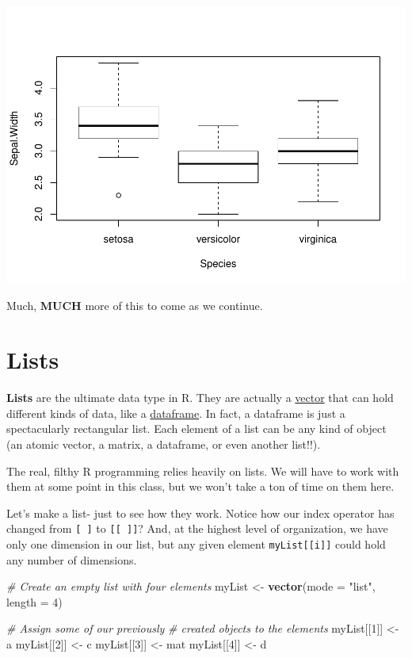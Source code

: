 \documentclass[
]{book}
\newenvironment{Shaded}{\begin{snugshade}}{\end{snugshade}}
\newcommand{\CommentTok}[1]{\textcolor[rgb]{0.56,0.35,0.01}{\textit{#1}}}
\newcommand{\DataTypeTok}[1]{\textcolor[rgb]{0.13,0.29,0.53}{#1}}
\newcommand{\DecValTok}[1]{\textcolor[rgb]{0.00,0.00,0.81}{#1}}
\newcommand{\KeywordTok}[1]{\textcolor[rgb]{0.13,0.29,0.53}{\textbf{#1}}}
\newcommand{\NormalTok}[1]{#1}
\newcommand{\StringTok}[1]{\textcolor[rgb]{0.31,0.60,0.02}{#1}}
\begin{document}
\includegraphics{worstr_files/figure-latex/unnamed-chunk-53-3.pdf}

Much, \textbf{MUCH} more of this to come as we continue.

\hypertarget{lists}{%
\section{Lists}\label{lists}}

\textbf{Lists} are the ultimate data type in R. They are actually a \href{vectors}{vector} that can hold different kinds of data, like a \protect\hyperlink{dataframes}{dataframe}. In fact, a dataframe is just a spectacularly rectangular list. Each element of a list can be any kind of object (an atomic vector, a matrix, a dataframe, or even another list!!).

The real, filthy R programming relies heavily on lists. We will have to work with them at some point in this class, but we won't take a ton of time on them here.

Let's make a list- just to see how they work. Notice how our index operator has changed from \texttt{{[}\ {]}} to \texttt{{[}{[}\ {]}{]}}? And, at the highest level of organization, we have only one dimension in our list, but any given element \texttt{myList{[}{[}i{]}{]}} could hold any number of dimensions.

\begin{Shaded}
\begin{Highlighting}[]
\CommentTok{# Create an empty list with four elements}
\NormalTok{myList <-}\StringTok{ }\KeywordTok{vector}\NormalTok{(}\DataTypeTok{mode =} \StringTok{"list"}\NormalTok{, }\DataTypeTok{length =} \DecValTok{4}\NormalTok{)}

\CommentTok{# Assign some of our previously}
\CommentTok{# created objects to the elements}
\NormalTok{myList[[}\DecValTok{1}\NormalTok{]] <-}\StringTok{ }\NormalTok{a}
\NormalTok{myList[[}\DecValTok{2}\NormalTok{]] <-}\StringTok{ }\NormalTok{c}
\NormalTok{myList[[}\DecValTok{3}\NormalTok{]] <-}\StringTok{ }\NormalTok{mat}
\NormalTok{myList[[}\DecValTok{4}\NormalTok{]] <-}\StringTok{ }\NormalTok{d}
\end{Highlighting}
\end{Shaded}
\end{document}
